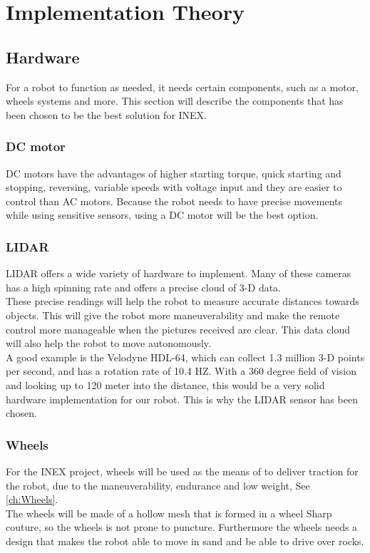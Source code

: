 \chapter{Implementation Theory}\label{ch:Implementation Theory}

\section{Hardware}
For a robot to function as needed, it needs certain components, such as a motor, wheels systems and more. This section will describe the components that has been chosen to be the best solution for INEX.

\subsection{DC motor}
DC motors have the advantages of higher starting torque, quick starting and stopping, reversing, variable speeds with voltage input and they are easier to control than AC motors. Because the robot needs to have precise movements while using sensitive sensors, using a DC motor will be the best option.

\subsection{LIDAR}
LIDAR offers a wide variety of hardware to implement. Many of these cameras has a high spinning rate and offers a precise cloud of 3-D data.\\
These precise readings will help the robot to measure accurate distances towards objects. This will give the robot more maneuverability and make the remote control more manageable when the pictures received are clear. This data cloud will also help the robot to move autonomously.\\
A good example is the Velodyne HDL-64, which can collect 1.3 million 3-D points per second, and has a rotation rate of 10.4 HZ. With a 360 degree field of vision and looking up to 120 meter into the distance, this would be a very solid hardware implementation for our robot. \cite{Lidar360}
This is why the LIDAR sensor has been chosen. 


\subsection{Wheels}
For the INEX project, wheels will be used as the means of to deliver traction for the robot, due to the maneuverability, endurance and low weight, See \ref{ch:Wheels}.\\
The wheels will be made of a hollow mesh that is formed in a wheel Sharp couture, so the wheels is not prone to puncture. Furthermore the wheels needs a design that makes the robot able to move in sand and be able to drive over rocks.  

